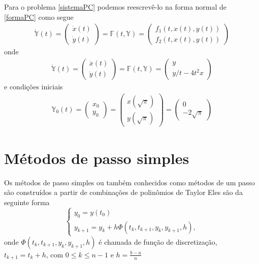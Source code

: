 \documentclass[amsmath,amssymb,floatfix]{revtex4}
\begin{document}
Para o problema \eqref{sistemaPC} podemos reescrevê-lo na forma normal de \eqref{formaPC} como segue
\begin{eqnarray*}
\dot{\mathbb{Y}}(t)
  = \begin{pmatrix} \dot x(t) \\ \dot y(t) \end{pmatrix}
  = \mathbb{F}(t, \mathbb{Y})
  = \begin{pmatrix} f_1(t,x(t),y(t))\\ f_2(t,x(t),y(t))\end{pmatrix}
 \end{eqnarray*}
 onde
 \begin{eqnarray}\label{nossoPC}
 \dot{\mathbb{Y}}(t)
  = \begin{pmatrix} \dot x(t) \\ \dot y(t) \end{pmatrix}
  = \mathbb{F}(t, \mathbb{Y})
 = \begin{pmatrix} y\\ y/t - 4t^2x \end{pmatrix}
 \end{eqnarray}
 e condições iniciais
 \begin{eqnarray}\label{nossaCI}
 {\mathbb{Y}_0}(t)
 =\begin{pmatrix}  x_0 \\ y_0 \end{pmatrix}
  = \begin{pmatrix}  x(\sqrt{\pi}) \\  y(\sqrt{\pi}) \end{pmatrix}
  = \begin{pmatrix} 0 \\ -2\sqrt{\pi} \end{pmatrix}
 \end{eqnarray}

\section{Métodos de passo simples}
Os métodos de passo simples ou também conhecidos como métodos de um passo são construídos a partir de combinações de polinômios de Taylor \cite{numerical,collatz} %
Eles são da seguinte forma
\begin{equation}\label{def metodos}
\begin{cases}
 y_0 = y(t_0) \\ 
 y_{k+1} = y_k + h \Phi(t_k, t_{k+1}, y_k, y_{k+1}, h),
\end{cases}
\end{equation}
onde $\Phi(t_k, t_{k+1}, y_k, y_{k+1}, h)$ é chamada de função de discretização, $t_{k+1} = t_k + h$, com $0\leqslant k \leqslant n-1$ e $h = \frac{b-a}{n}$
\end{document}
